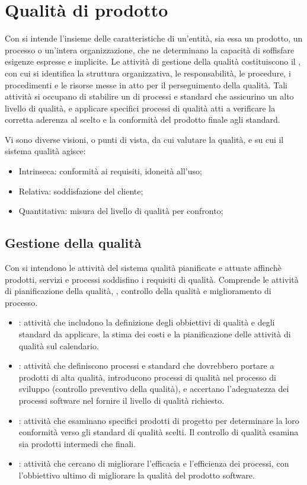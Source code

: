 \section{Qualità di prodotto}
Con  si intende l'insieme delle caratteristiche di un'entità, sia essa un prodotto, un processo o un'intera organizzazione, che ne determinano la capacità di soffisfare esigenze espresse e implicite. Le attività di gestione della qualità costituiscono il , con cui si identifica la struttura organizzativa, le responsabilità, le procedure, i procedimenti e le risorse messe in atto per il perseguimento della qualità. Tali attività  si occupano di stabilire un  di processi e standard che assicurino un alto livello di qualità, e applicare specifici processi di qualità atti a verificare la corretta aderenza al  scelto e la conformità del prodotto finale agli standard.

Vi sono diverse visioni, o punti di vista, da cui valutare la qualità, e su cui il sistema qualità agisce:
\begin{itemize}
	\item Intrinseca: conformità ai requisiti, idoneità all'uso;
	\item Relativa: soddisfazione del cliente;
	\item Quantitativa: misura del livello di qualità per confronto;
\end{itemize}

\subsection{Gestione della qualità}
Con  si intendono le attività del sistema qualità pianificate e attuate affinchè prodotti, servizi e processi soddisfino i requisiti di qualità. Comprende le attività di pianificazione della qualità, , controllo della qualità e miglioramento di processo.

\begin{itemize}
	\item {}: attività che includono la definizione degli obbiettivi di qualità e degli standard da applicare, la stima dei costi e la pianificazione delle attività di qualità sul calendario.
	\item {}: attività che definiscono processi e standard che dovrebbero portare a prodotti di alta qualità, introducono processi di qualità nel processo di sviluppo (controllo preventivo della qualità), e accertano l'adeguatezza dei processi software nel fornire il livello di qualità richiesto.
	\item {}: attività che esaminano specifici prodotti di progetto per determinare la loro conformità verso gli standard di qualità scelti. Il controllo di qualità esamina sia prodotti intermedi che finali.
	\item {}: attività che cercano di migliorare l'efficacia e l'efficienza dei processi, con l'obbiettivo ultimo di migliorare la qualità del prodotto software.
\end{itemize}

